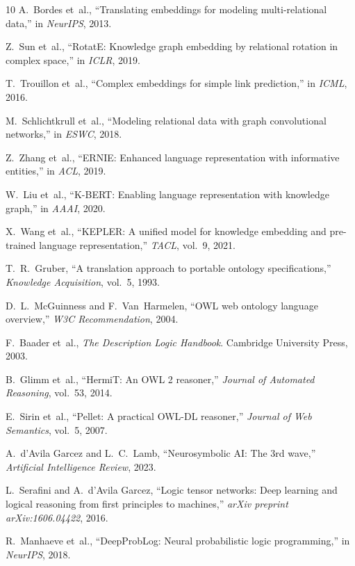 \documentclass[conference]{IEEEtran}
\begin{document}
\begin{thebibliography}{10}
A.~Bordes et~al., ``Translating embeddings for modeling multi-relational data,'' in \emph{NeurIPS}, 2013.

Z.~Sun et~al., ``RotatE: Knowledge graph embedding by relational rotation in complex space,'' in \emph{ICLR}, 2019.

T.~Trouillon et~al., ``Complex embeddings for simple link prediction,'' in \emph{ICML}, 2016.

M.~Schlichtkrull et~al., ``Modeling relational data with graph convolutional networks,'' in \emph{ESWC}, 2018.

Z.~Zhang et~al., ``ERNIE: Enhanced language representation with informative entities,'' in \emph{ACL}, 2019.

W.~Liu et~al., ``K-BERT: Enabling language representation with knowledge graph,'' in \emph{AAAI}, 2020.

X.~Wang et~al., ``KEPLER: A unified model for knowledge embedding and pre-trained language representation,'' \emph{TACL}, vol.~9, 2021.

T.~R.~Gruber, ``A translation approach to portable ontology specifications,'' \emph{Knowledge Acquisition}, vol.~5, 1993.

D.~L.~McGuinness and F.~Van~Harmelen, ``OWL web ontology language overview,'' \emph{W3C Recommendation}, 2004.

F.~Baader et~al., \emph{The Description Logic Handbook}. Cambridge University Press, 2003.

B.~Glimm et~al., ``HermiT: An OWL 2 reasoner,'' \emph{Journal of Automated Reasoning}, vol.~53, 2014.

E.~Sirin et~al., ``Pellet: A practical OWL-DL reasoner,'' \emph{Journal of Web Semantics}, vol.~5, 2007.

A.~d'Avila Garcez and L.~C.~Lamb, ``Neurosymbolic AI: The 3rd wave,'' \emph{Artificial Intelligence Review}, 2023.

L.~Serafini and A.~d'Avila Garcez, ``Logic tensor networks: Deep learning and logical reasoning from first principles to machines,'' \emph{arXiv preprint arXiv:1606.04422}, 2016.

R.~Manhaeve et~al., ``DeepProbLog: Neural probabilistic logic programming,'' in \emph{NeurIPS}, 2018.


\end{thebibliography}
\end{document}
